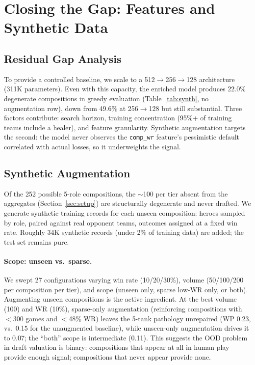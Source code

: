 \documentclass[journal]{IEEEtran}
\begin{document}
\section{Closing the Gap: Features and Synthetic Data}
\label{sec:repair}

\subsection{Residual Gap Analysis}

To provide a controlled baseline, we scale to a 512$\to$256$\to$128 architecture (311K parameters). Even with this capacity, the enriched model produces 22.0\% degenerate compositions in greedy evaluation (Table~\ref{tab:synth}, no augmentation row), down from 49.6\% at 256$\to$128 but still substantial. Three factors contribute: search horizon, training concentration (95\%+ of training teams include a healer), and feature granularity. Synthetic augmentation targets the second: the model never observes the \texttt{comp\_wr} feature's pessimistic default correlated with actual losses, so it underweights the signal.

\subsection{Synthetic Augmentation}

Of the 252 possible 5-role compositions, the $\sim$100 per tier absent from the aggregates (Section~\ref{sec:setup}) are structurally degenerate and never drafted. We generate synthetic training records for each unseen composition: heroes sampled by role, paired against real opponent teams, outcomes assigned at a fixed win rate. Roughly 34K synthetic records (under 2\% of training data) are added; the test set remains pure.

\paragraph{Scope: unseen vs.\ sparse.} We swept 27 configurations varying win rate (10/20/30\%), volume (50/100/200 per composition per tier), and scope (unseen only, sparse low-WR only, or both). Augmenting unseen compositions is the active ingredient. At the best volume (100) and WR (10\%), sparse-only augmentation (reinforcing compositions with $<$300 games and $<$48\% WR) leaves the 5-tank pathology unrepaired (WP 0.23, vs.\ 0.15 for the unaugmented baseline), while unseen-only augmentation drives it to 0.07; the ``both'' scope is intermediate (0.11). This suggests the OOD problem in draft valuation is binary: compositions that appear at all in human play provide enough signal; compositions that never appear provide none.
\end{document}
